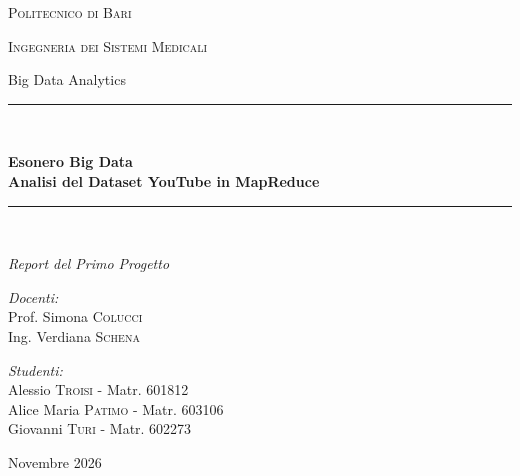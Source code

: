 \documentclass[12pt, a4paper]{article}
\begin{document}
\begin{titlepage}
    \centering
    
    {\scshape\LARGE Politecnico di Bari \par}
    \vspace{0.5cm}
    {\scshape\Large Ingegneria dei Sistemi Medicali \par}
    \vspace{1.5cm}
    {\Large Big Data Analytics \par}
    \vspace{2.5cm}
    
    \rule{\linewidth}{0.5mm} \\[0.5cm]
    {\huge \bfseries Esonero Big Data \\[0.5cm] 
    \Large Analisi del Dataset YouTube in MapReduce \par}
    \rule{\linewidth}{0.5mm} \\[1.5cm]
    
    {\Large \textit{Report del Primo Progetto} \par}
    
    \vfill
    
\noindent
\begin{minipage}[t]{0.40\textwidth}
    \vspace{0pt}
    \begin{flushleft}
        \large
        \emph{Docenti:}\\
        Prof. Simona \textsc{Colucci}\\
        Ing. Verdiana \textsc{Schena}
    \end{flushleft}
\end{minipage}
\hfill
\begin{minipage}[t]{0.55\textwidth}
    \vspace{0pt}
    \begin{flushright}
        \large
        \emph{Studenti:}\\
        Alessio \textsc{Troisi} - Matr. 601812\\
        Alice Maria \textsc{Patimo} - Matr. 603106\\
        Giovanni \textsc{Turi} - Matr. 602273
    \end{flushright}
\end{minipage}
    
    \vspace{2.5cm}
    
    {\large Novembre 2026 \par}
\end{titlepage}
\end{document}
